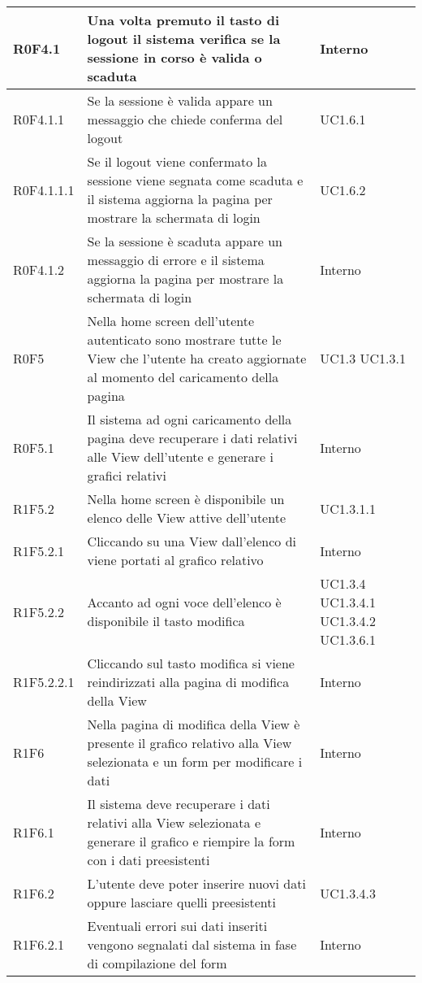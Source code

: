 \begin{center}
\begin{longtable}{| p{2cm} | p{8cm} | p{2cm} |}
		R0F4.1  &  Una volta premuto il tasto di logout il sistema verifica se la sessione in corso è valida o scaduta  &  Interno \\
		\hline
		R0F4.1.1  &  Se la sessione è valida appare un messaggio che chiede conferma del logout  &  UC1.6.1 \\
		\hline
		R0F4.1.1.1  &  Se il logout viene confermato la sessione viene segnata come scaduta e il sistema aggiorna la pagina per mostrare la schermata di login  &  UC1.6.2 \\
		\hline
		R0F4.1.2  &  Se la sessione è scaduta appare un messaggio di errore e il sistema aggiorna la pagina per mostrare la schermata di login  &  Interno \\
		\hline
		R0F5  &  Nella home screen dell'utente autenticato sono mostrare tutte le View che l'utente ha creato aggiornate al momento del caricamento della pagina &  UC1.3 \newline UC1.3.1 \\
		\hline
		R0F5.1  &  Il sistema ad ogni caricamento della pagina deve recuperare i dati relativi alle View dell'utente e generare i grafici relativi  &  Interno \\
		\hline
		R1F5.2  &  Nella home screen è disponibile un elenco delle View attive dell'utente  &  UC1.3.1.1 \\
		\hline
		R1F5.2.1  &  Cliccando su una View dall'elenco di viene portati al grafico relativo  &  Interno \\
		\hline
		R1F5.2.2  &  Accanto ad ogni voce dell'elenco è disponibile il tasto modifica  &  UC1.3.4 \newline UC1.3.4.1 \newline UC1.3.4.2 \newline UC1.3.6.1 \\
		\hline
		R1F5.2.2.1  &  Cliccando sul tasto modifica si viene reindirizzati alla pagina di modifica della View  &  Interno \\
		\hline
		R1F6  &  Nella pagina di modifica della View è presente il grafico relativo alla View selezionata e un form per modificare i dati  &  Interno \\
		\hline
		R1F6.1  &  Il sistema deve recuperare i dati relativi alla View selezionata e generare il grafico e riempire la form con i dati preesistenti  &  Interno \\
		\hline
		R1F6.2  &  L'utente deve poter inserire nuovi dati oppure lasciare quelli preesistenti  &  UC1.3.4.3 \\
		\hline
		R1F6.2.1  &  Eventuali errori sui dati inseriti vengono segnalati dal sistema in fase di compilazione del form  &  Interno \\

\end{longtable}
\end{center}
